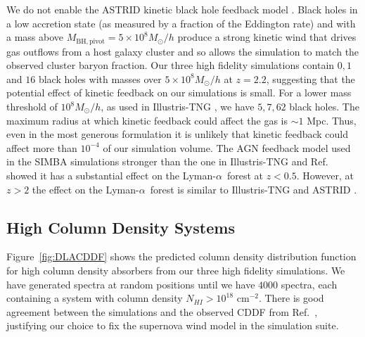 \documentclass[a4paper,11pt]{article}
\newcommand{\Lya}{Lyman-$\alpha$}
\begin{document}
We do not enable the ASTRID kinetic black hole feedback model \cite{Ni:2023}. Black holes in a low accretion state (as measured by a fraction of the Eddington rate) and with a mass above $M_\mathrm{BH, pivot} = 5\times 10^8 M_\odot/h$ produce a strong kinetic wind that drives gas outflows from a host galaxy cluster and so allows the simulation to match the observed cluster baryon fraction.
Our three high fidelity simulations contain $0, 1$ and $16$ black holes with masses over $5\times 10^8 M_\odot/h$ at $z=2.2$, suggesting that the potential effect of kinetic feedback on our simulations is small. For a lower mass threshold of $10^8 M_\odot/h$, as used in Illustris-TNG \cite{Weinberger:2017}, we have $5, 7, 62$ black holes. The maximum radius at which kinetic feedback could affect the gas is $\sim 1$ Mpc. Thus, even in the most generous formulation it is unlikely that kinetic feedback could affect more than $10^{-4}$ of our simulation volume. The AGN feedback model used in the SIMBA simulations \cite{SIMBA} stronger than the one in Illustris-TNG and Ref.~\cite{Tillman:2022} showed it has a substantial effect on the \Lya~forest at $z < 0.5$. However, at $z > 2$ the effect on the \Lya~forest is similar to Illustris-TNG and ASTRID \cite{Tillman:2023}.


\subsection{High Column Density Systems}
\label{sec:dlas}

Figure~\ref{fig:DLACDDF} shows the predicted column density distribution function for high column density absorbers from our three high fidelity simulations. We have generated spectra at random positions until we have $4000$ spectra, each containing a system with column density $N_{HI} > 10^{18}$ cm$^{-2}$. There is good agreement between the simulations and the observed CDDF from Ref.~\cite{2021MNRAS.507..704H}, justifying our choice to fix the supernova wind model in the simulation suite.
\end{document}
